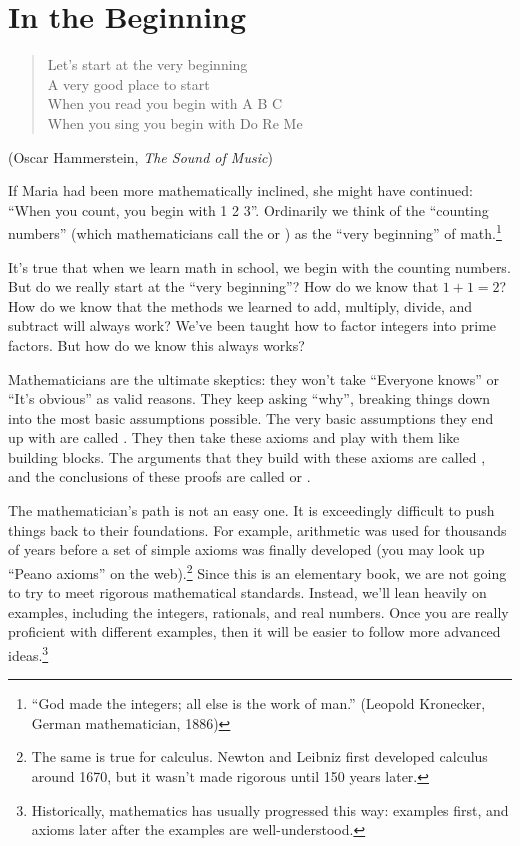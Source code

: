 
\section{In the Beginning\quad
{}}
\begin{verse}
Let's start at the very beginning\\
A very good place to start\\
When you read you begin with A B C\\
When you sing you begin with Do Re Me
\end{verse}
\medskip

(Oscar Hammerstein, \emph{The Sound of Music})
\bigskip

If Maria had been more mathematically inclined, she might have continued:  ``When you count, you begin with 1 2 3''. Ordinarily we think of the ``counting numbers''  (which mathematicians call the  or ) as the ``very beginning'' of math.\footnote{ ``God made the integers; all else is the work of man.'' (Leopold Kronecker, German mathematician, 1886)}
\medskip

It's true that when we learn math in school, we begin with the counting numbers. But do we really start at the ``very beginning''?   How do we know that $1 + 1 = 2$? How do we know that the methods we learned to add,  multiply, divide, and subtract will always work? We've been taught how to factor integers into prime factors. But how do we know this always works?

 Mathematicians  are the ultimate skeptics: they won't take ``Everyone knows'' or ``It's obvious''  as valid reasons. They keep asking ``why'', breaking things down into the most basic assumptions possible. The very basic assumptions they end up with are called . They then take these axioms and play with them like building blocks. The arguments that they build with these axioms are called , and the conclusions of these proofs are called  or .  

The mathematician's path is not an easy one. It is exceedingly  difficult to push things back to their foundations. For example, arithmetic was used for thousands of years before a set of simple axioms was finally developed (you may look up ``Peano axioms'' on the web).\footnote{The same is true for calculus. Newton and Leibniz first developed calculus around 1670, but it wasn't made rigorous until 150 years later.}
Since this is an elementary book, we are not going to try to meet rigorous mathematical standards. Instead, we'll lean heavily on examples, including the integers, rationals, and real numbers. Once you are really proficient with different examples, then it will be easier to follow more advanced ideas.\footnote{Historically, mathematics has usually progressed this way: examples first, 
and axioms later after the examples are well-understood.}

